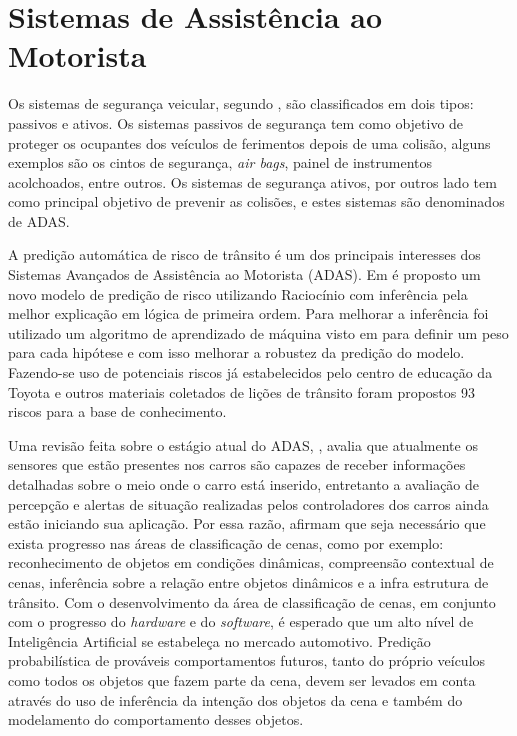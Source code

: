 \documentclass[
	12pt,				%
    oneside,			%
	a4paper,			%
	english,			%
	french,				%
	spanish,			%
	brazil,				%
	]{abntex2}
\begin{document}
\section {Sistemas de Assistência ao Motorista}

Os sistemas de segurança veicular, segundo , são classificados em dois tipos: passivos e ativos. Os sistemas passivos de segurança tem como objetivo de proteger os ocupantes dos veículos de ferimentos depois de uma colisão, alguns exemplos são os cintos de segurança, \textit{air bags}, painel de instrumentos acolchoados, entre outros. Os sistemas de segurança ativos, por outros lado tem como principal objetivo de prevenir as colisões, e estes sistemas são denominados de ADAS.

A predição automática de risco de trânsito é um dos principais interesses dos Sistemas Avançados de Assistência ao Motorista (ADAS). Em  é proposto um novo modelo de predição de risco utilizando Raciocínio com inferência pela melhor explicação em lógica de primeira ordem. Para melhorar a inferência foi utilizado um algoritmo de aprendizado de máquina visto em  para definir um peso para cada hipótese e com isso melhorar a robustez da predição do modelo. Fazendo-se uso de potenciais riscos já estabelecidos pelo centro de educação da Toyota e outros materiais coletados de lições de trânsito foram propostos 93 riscos para a base de conhecimento.

Uma revisão feita sobre o estágio atual do ADAS, , avalia que atualmente os sensores que estão presentes nos carros são capazes de receber informações detalhadas sobre o meio onde o carro está inserido, entretanto a avaliação de percepção e alertas de situação realizadas pelos controladores dos carros ainda estão iniciando sua aplicação. Por essa razão, afirmam que seja necessário que exista progresso nas áreas de classificação de cenas, como por exemplo: reconhecimento de objetos em condições dinâmicas, compreensão contextual de cenas, inferência sobre a relação entre objetos dinâmicos e a infra estrutura de trânsito. Com o desenvolvimento da área de classificação de cenas, em conjunto com o progresso do \textit{hardware} e do \textit{software}, é esperado que um alto nível de Inteligência Artificial se estabeleça no mercado automotivo. Predição probabilística de prováveis comportamentos futuros, tanto do próprio veículos como todos os objetos que fazem parte da cena, devem ser levados em conta através do uso de inferência da intenção dos objetos da cena e também do modelamento do comportamento desses objetos.
\end{document}
